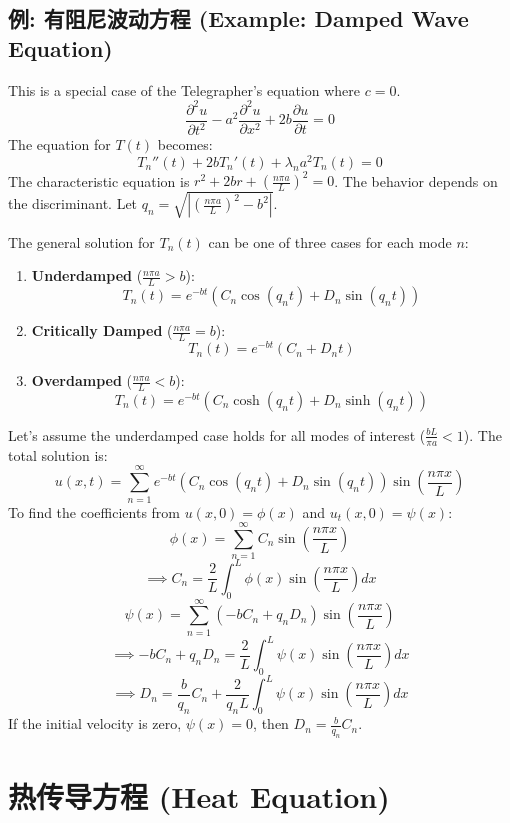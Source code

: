 \documentclass{article}
\begin{document}
	\subsection*{例: 有阻尼波动方程 (Example: Damped Wave Equation)}
	This is a special case of the Telegrapher's equation where $c=0$.
	$$ \frac{\partial^2 u}{\partial t^2} - a^2 \frac{\partial^2 u}{\partial x^2} + 2b \frac{\partial u}{\partial t} = 0 $$
	The equation for $T(t)$ becomes:
	$$ T_n''(t) + 2b T_n'(t) + \lambda_n a^2 T_n(t) = 0 $$
	The characteristic equation is $r^2 + 2br + (\frac{n\pi a}{L})^2 = 0$. The behavior depends on the discriminant. Let $q_n = \sqrt{\left| (\frac{n\pi a}{L})^2 - b^2 \right|}$.
	
	The general solution for $T_n(t)$ can be one of three cases for each mode $n$:
	\begin{enumerate}
		\item \textbf{Underdamped} ($\frac{n\pi a}{L} > b$):
		$$ T_n(t) = e^{-bt} \left(C_n \cos(q_n t) + D_n \sin(q_n t)\right) $$
		\item \textbf{Critically Damped} ($\frac{n\pi a}{L} = b$):
		$$ T_n(t) = e^{-bt} (C_n + D_n t) $$
		\item \textbf{Overdamped} ($\frac{n\pi a}{L} < b$):
		$$ T_n(t) = e^{-bt} \left(C_n \cosh(q_n t) + D_n \sinh(q_n t)\right) $$
	\end{enumerate}
	Let's assume the underdamped case holds for all modes of interest ($\frac{bL}{\pi a} < 1$). The total solution is:
	$$ u(x,t) = \sum_{n=1}^{\infty} e^{-bt} \left(C_n \cos(q_n t) + D_n \sin(q_n t)\right) \sin\left(\frac{n\pi x}{L}\right) $$
	To find the coefficients from $u(x,0) = \phi(x)$ and $u_t(x,0)=\psi(x)$:
	$$ \phi(x) = \sum_{n=1}^{\infty} C_n \sin\left(\frac{n\pi x}{L}\right) $$
	$$ \implies C_n = \frac{2}{L} \int_0^L \phi(x) \sin\left(\frac{n\pi x}{L}\right) dx $$
	$$ \psi(x) = \sum_{n=1}^{\infty} (-b C_n + q_n D_n) \sin\left(\frac{n\pi x}{L}\right) $$
	$$ \implies -b C_n + q_n D_n = \frac{2}{L} \int_0^L \psi(x) \sin\left(\frac{n\pi x}{L}\right) dx $$
	$$ \implies D_n = \frac{b}{q_n} C_n + \frac{2}{q_n L} \int_0^L \psi(x) \sin\left(\frac{n\pi x}{L}\right) dx $$
	If the initial velocity is zero, $\psi(x)=0$, then $D_n = \frac{b}{q_n}C_n$.
	
	\newpage
	\section*{热传导方程 (Heat Equation)}
\end{document}
